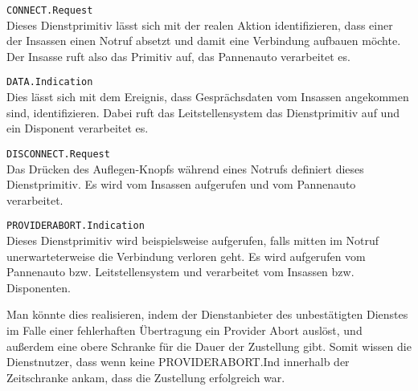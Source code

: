 \documentclass{../exercisesheet}
\begin{document}
\begin{exercise}{2}
	\begin{subexercise} \texttt{CONNECT.Request}\\
		Dieses Dienstprimitiv lässt sich mit der realen Aktion identifizieren, dass einer der Insassen einen Notruf absetzt und damit eine Verbindung aufbauen möchte. Der
		Insasse ruft also das Primitiv auf, das Pannenauto verarbeitet es.
	\end{subexercise}

	\begin{subexercise} \texttt{DATA.Indication}\\
		Dies lässt sich mit dem Ereignis, dass Gesprächsdaten vom Insassen angekommen sind, identifizieren. Dabei ruft das Leitstellensystem das Dienstprimitiv auf und
		ein Disponent verarbeitet es.
	\end{subexercise}

	\begin{subexercise} \texttt{DISCONNECT.Request}\\
		Das Drücken des Auflegen-Knopfs während eines Notrufs definiert dieses Dienstprimitiv. Es wird vom Insassen aufgerufen und vom Pannenauto verarbeitet.
	\end{subexercise}

	\begin{subexercise} \texttt{PROVIDERABORT.Indication}\\
		Dieses Dienstprimitiv wird beispielsweise aufgerufen, falls mitten im Notruf unerwarteterweise die Verbindung verloren geht. Es wird aufgerufen vom Pannenauto
		bzw. Leitstellensystem und verarbeitet vom Insassen bzw. Disponenten.
	\end{subexercise}
\end{exercise}

\begin{exercise}{1.5}
	Man könnte dies realisieren, indem der Dienstanbieter des unbestätigten Dienstes im Falle einer fehlerhaften Übertragung ein Provider Abort auslöst, und außerdem eine
	obere Schranke für die Dauer der Zustellung gibt. Somit wissen die Dienstnutzer, dass wenn keine PROVIDERABORT.Ind innerhalb der Zeitschranke ankam, dass die Zustellung
	erfolgreich war.
\end{exercise}

\begin{exercise}{3.5}
	\begin{subexercise}
		
	\end{subexercise}

	\begin{subexercise}
		  
	\end{subexercise}
\end{exercise}
\end{document}
